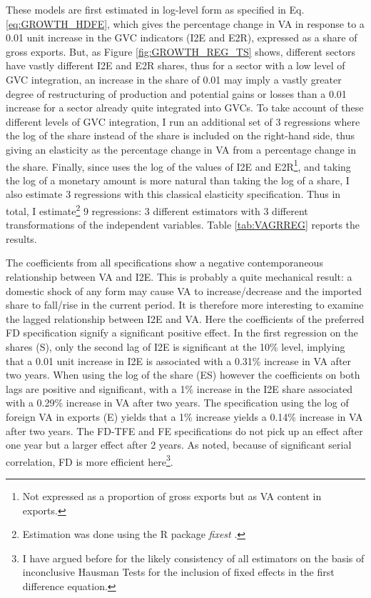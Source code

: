 \documentclass[a4paper]{article}
\begin{document}
These models are first estimated in log-level form as specified in Eq. \ref{eq:GROWTH_HDFE}, which gives the percentage change in VA in response to a 0.01 unit increase in the GVC indicators (I2E and E2R), expressed as a share of gross exports. But, as Figure \ref{fig:GROWTH_REG_TS} shows, different sectors have vastly different I2E and E2R shares, thus for a sector with a low level of GVC integration, an increase in the share of 0.01 may imply a vastly greater degree of restructuring of production and potential gains or losses than a 0.01 increase for a sector already quite integrated into GVCs. To take account of these different levels of GVC integration, I run an additional set of 3 regressions where the log of the share instead of the share is included on the right-hand side, thus giving an elasticity as the percentage change in VA from a percentage change in the share. Finally, since \citet{Kummritz20161} uses the log of the values of I2E and E2R\footnote{Not expressed as a proportion of gross exports but as VA content in exports.}, and taking the log of a monetary amount is more natural than taking the log of a share, I also estimate 3 regressions with this classical elasticity specification. Thus in total, I estimate\footnote{Estimation was done using the R package \textit{fixest} \citep{fixest2018}.} 9 regressions: 3 different estimators with 3 different transformations of the independent variables. Table \ref{tab:VAGRREG} reports the results. \newline 

The coefficients from all specifications show a negative contemporaneous relationship between VA and I2E. This is probably a quite mechanical result: a domestic shock of any form may cause VA to increase/decrease and the imported share to fall/rise in the current period. It is therefore more interesting to examine the lagged relationship between I2E and VA. Here the coefficients of the preferred FD specification signify a significant positive effect. In the first regression on the shares (S), only the second lag of I2E is significant at the 10\% level, implying that a 0.01 unit increase in I2E is associated with a 0.31\% increase in VA after two years. When using the log of the share (ES) however the coefficients on both lags are positive and significant, with a 1\% increase in the I2E share associated with a  0.29\% increase in VA after two years. The specification using the log of foreign VA in exports (E) yields that a 1\% increase yields a 0.14\% increase in VA after two years. The FD-TFE and FE specifications do not pick up an effect after one year but a larger effect after 2 years. As noted, because of significant serial correlation, FD is more efficient here\footnote{I have argued before for the likely consistency of all estimators on the basis of inconclusive Hausman Tests for the inclusion of fixed effects in the first difference equation.}. \newline %
\end{document}
